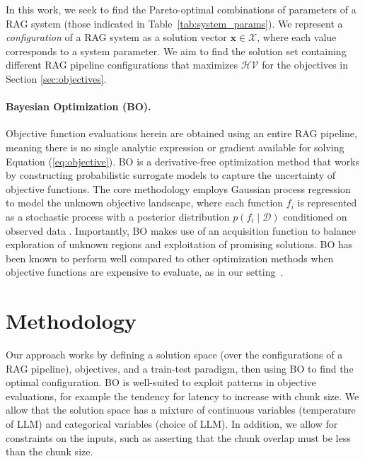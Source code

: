 In this work, we seek to find the Pareto-optimal combinations of parameters of a RAG system (those indicated in Table~\ref{tab:system_params}). We represent a \emph{configuration} of a RAG system as a solution vector $\mathbf{x} \in \mathcal{X}$, where each value corresponds to a system parameter. We aim to find the solution set containing different RAG pipeline configurations that maximizes $\mathcal{HV}$ for the objectives in Section \ref{sec:objectives}.

\paragraph{Bayesian Optimization (BO).} Objective function evaluations herein are obtained using an entire RAG pipeline, meaning there is no single analytic expression or gradient available for solving Equation (\ref{eq:objective}). BO is a derivative-free optimization method that works by constructing probabilistic surrogate models to capture the uncertainty of objective functions. The core methodology employs Gaussian process regression to model the unknown objective landscape, where each function $f_i$ is represented as a stochastic process with a posterior distribution $p(f_i \mid \mathcal{D})$ conditioned on observed data \citep{williams2006gaussian}. Importantly, BO makes use of an acquisition function to balance exploration of unknown regions and exploitation of promising solutions. BO has been known to perform well compared to other optimization methods when objective functions are expensive to evaluate, as in our setting~\citep{gramacy2020surrogates, diessner2022investigating,guerreiro2021hypervolume}.

\section{Methodology}
\label{sec:methodology}

Our approach works by defining a solution space (over the configurations of a RAG pipeline), objectives, and a train-test paradigm, then using BO to find the optimal configuration. BO is well-suited to exploit patterns in objective evaluations, for example the tendency for latency to increase with chunk size. We allow that the solution space has a mixture of continuous variables (\eg temperature of LLM) and categorical variables (\eg choice of LLM). In addition, we allow for constraints on the inputs, such as asserting that the chunk overlap must be less than the chunk size.

